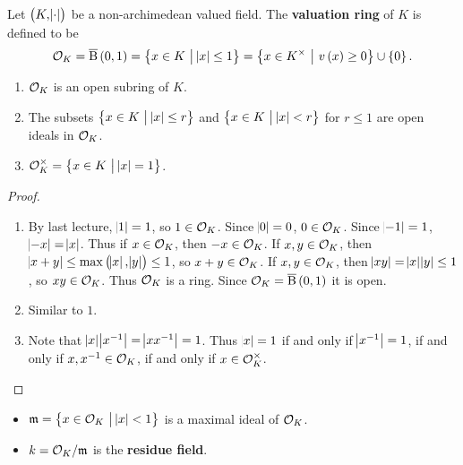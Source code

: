 \begin{definition}
Let $ \br{K, \abs{\cdot}} $ be a non-archimedean valued field. The \textbf{valuation ring} of $ K $ is defined to be
$$ \OOO_K = \overline{\B}\br{0, 1} = \cbr{x \in K \st \abs{x} \le 1} = \cbr{x \in K^\times \st v\br{x} \ge 0} \cup \cbr{0}. $$
\end{definition}

\begin{proposition}
\hfill
\begin{enumerate}
\item $ \mathcal{O}_K $ is an open subring of $ K $.
\item The subsets $ \cbr{x \in K \st \abs{x} \le r} $ and $ \cbr{x \in K \st \abs{x} < r} $ for $ r \le 1 $ are open ideals in $ \mathcal{O}_K $.
\item $ \OOO_K^\times = \cbr{x \in K \st \abs{x} = 1} $.
\end{enumerate}
\end{proposition}

\begin{proof}
\hfill
\begin{enumerate}
\item By last lecture, $ \abs{1} = 1 $, so $ 1 \in \mathcal{O}_K $. Since $ \abs{0} = 0 $, $ 0 \in \mathcal{O}_K $. Since $ \abs{-1} = 1 $, $ \abs{-x} = \abs{x} $. Thus if $ x \in \mathcal{O}_K $, then $ -x \in \mathcal{O}_K $. If $ x, y \in \mathcal{O}_K $, then $ \abs{x + y} \le \max\br{\abs{x}, \abs{y}} \le 1 $, so $ x + y \in \mathcal{O}_K $. If $ x, y \in \mathcal{O}_K $, then $ \abs{xy} = \abs{x}\abs{y} \le 1 $, so $ xy \in \mathcal{O}_K $. Thus $ \mathcal{O}_K $ is a ring. Since $ \OOO_K = \overline{\B}\br{0, 1} $ it is open.
\item Similar to $ 1 $.
\item Note that $ \abs{x}\abs{x^{-1}} = \abs{xx^{-1}} = 1 $. Thus $ \abs{x} = 1 $ if and only if $ \abs{x^{-1}} = 1 $, if and only if $ x, x^{-1} \in \mathcal{O}_K $, if and only if $ x \in \mathcal{O}_K^\times $.
\end{enumerate}
\end{proof}

\begin{notation*}
\hfill
\begin{itemize}
\item $ \mmm = \cbr{x \in \OOO_K \st \abs{x} < 1} $ is a maximal ideal of $ \mathcal{O}_K $.
\item $ k = \mathcal{O}_K / \mathfrak{m} $ is the \textbf{residue field}.
\end{itemize}
\end{notation*}


